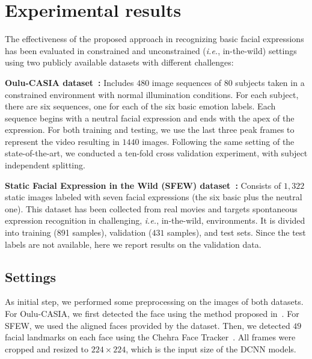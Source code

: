 \documentclass{bmvc2k}
\begin{document}
\section{Experimental results}\label{sect:results}
The effectiveness of the proposed approach in recognizing basic facial expressions has been evaluated in constrained and unconstrained (\emph{i.e.}, in-the-wild) settings using two publicly available datasets with different challenges:

\textbf{Oulu-CASIA dataset~\cite{zhao2011facial}:} Includes $480$ image sequences of $80$ subjects taken in a constrained environment with normal illumination conditions. For each subject, there are six sequences, one for each of the six basic emotion labels. Each sequence begins with a neutral facial expression and ends with the apex of the expression.
For both training and testing, we use the last three peak frames to represent the video resulting in $1440$ images. Following the same setting of the state-of-the-art, we conducted a ten-fold cross validation experiment, with subject independent splitting. 

\textbf{Static Facial Expression in the Wild (SFEW) dataset~\cite{dhall2015video}:} Consists of $1,322$ static images labeled with seven facial expressions (the six basic plus the neutral one). This dataset has been collected from real movies and targets spontaneous expression recognition in challenging, \emph{i.e.}, in-the-wild, environments. It is divided into training (891 samples), validation ($431$ samples), and test sets. Since the test labels are not available, here we report results on the validation data.

\subsection{Settings}
As initial step, we performed some preprocessing on the images of both datasets. For Oulu-CASIA, we first detected the face using the method proposed in~\cite{viola2004robust}. For SFEW, we used the aligned faces provided by the dataset. Then, we detected $49$ facial landmarks on each face using the Chehra Face Tracker~\cite{asthana2014incremental}. All frames were cropped and resized to $224 \times 224$, which is the input size of the DCNN models.
\end{document}
